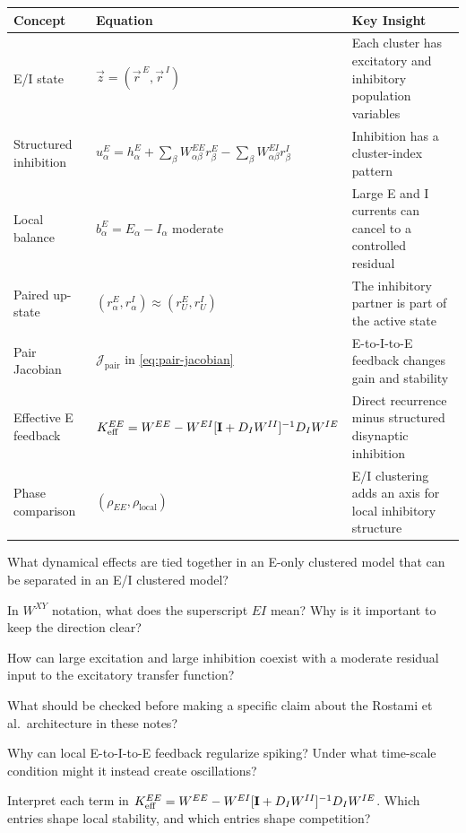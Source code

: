 \begin{chaptersummary}

\begin{center}
\renewcommand{\arraystretch}{1.45}
\begin{tabularx}{\textwidth}{@{}l X X@{}}
  \toprule
  \textbf{Concept} & \textbf{Equation} & \textbf{Key Insight} \\
  \midrule
  E/I state &
  $\vec z=(\vec r^{\,E},\vec r^{\,I})$ &
  Each cluster has excitatory and inhibitory population variables \\
  Structured inhibition &
  $u_{\alpha}^{E}=h_{\alpha}^{E}+\sum_{\beta}W_{\alpha\beta}^{EE}r_{\beta}^{E}-\sum_{\beta}W_{\alpha\beta}^{EI}r_{\beta}^{I}$ &
  Inhibition has a cluster-index pattern \\
  Local balance &
  $b_{\alpha}^{E}=E_{\alpha}-I_{\alpha}$ moderate &
  Large E and I currents can cancel to a controlled residual \\
  Paired up-state &
  $(r_{\alpha}^{E},r_{\alpha}^{I})\approx(r_U^E,r_U^I)$ &
  The inhibitory partner is part of the active state \\
  Pair Jacobian &
  $\mathcal{J}_{\mathrm{pair}}$ in \eqref{eq:pair-jacobian} &
  E-to-I-to-E feedback changes gain and stability \\
  Effective E feedback &
  $K_{\mathrm{eff}}^{EE}=W^{EE}-W^{EI}[\mathbf{I}+D_I W^{II}]{}^{-1}D_I W^{IE}$ &
  Direct recurrence minus structured disynaptic inhibition \\
  Phase comparison &
  $(\rho_{EE},\rho_{\mathrm{local}})$ &
  E/I clustering adds an axis for local inhibitory structure \\
  \bottomrule
\end{tabularx}
\end{center}

\end{chaptersummary}

\begin{conceptquestions}
  \item What dynamical effects are tied together in an E-only clustered model that can be separated in an E/I clustered model?

  \item In $W^{XY}$ notation, what does the superscript $EI$ mean? Why is it important to keep the direction clear?

  \item How can large excitation and large inhibition coexist with a moderate residual input to the excitatory transfer function?

  \item What should be checked before making a specific claim about the Rostami et al.\ architecture in these notes?

  \item Why can local E-to-I-to-E feedback regularize spiking? Under what time-scale condition might it instead create oscillations?

  \item Interpret each term in $K_{\mathrm{eff}}^{EE}=W^{EE}-W^{EI}[\mathbf{I}+D_I W^{II}]{}^{-1}D_I W^{IE}$. Which entries shape local stability, and which entries shape competition?
\end{conceptquestions}
